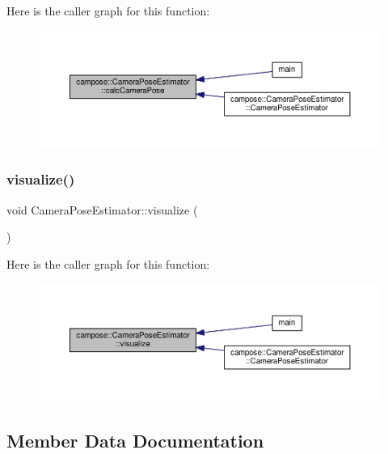 Here is the caller graph for this function\+:\nopagebreak
\begin{figure}[H]
\begin{center}
\leavevmode
\includegraphics[width=350pt]{classcampose_1_1CameraPoseEstimator_a975c193e745e9150f0726e188a2daa1e_icgraph}
\end{center}
\end{figure}
\mbox{\label{classcampose_1_1CameraPoseEstimator_ac1b95d78d7d3f4c8032d8e494034420c}} 
\subsubsection{\texorpdfstring{visualize()}{visualize()}}
{\footnotesize\ttfamily void Camera\+Pose\+Estimator\+::visualize (\begin{DoxyParamCaption}{ }\end{DoxyParamCaption})}

Here is the caller graph for this function\+:\nopagebreak
\begin{figure}[H]
\begin{center}
\leavevmode
\includegraphics[width=350pt]{classcampose_1_1CameraPoseEstimator_ac1b95d78d7d3f4c8032d8e494034420c_icgraph}
\end{center}
\end{figure}


\subsection{Member Data Documentation}
\mbox{\label{classcampose_1_1CameraPoseEstimator_a57173dd1d143e7ac26a039c078204bef}} 
